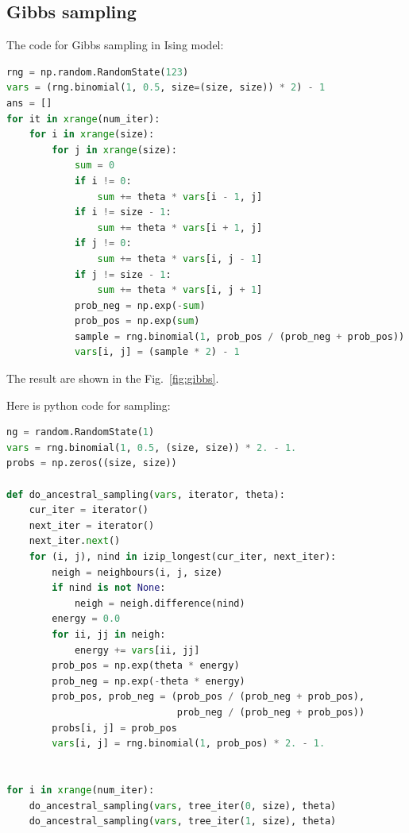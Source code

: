 \documentclass[a4paper]{article}
\begin{document}
\subsection{Gibbs sampling}
The code for Gibbs sampling in Ising model:
\begin{lstlisting}[language=Python]
rng = np.random.RandomState(123)
vars = (rng.binomial(1, 0.5, size=(size, size)) * 2) - 1
ans = []
for it in xrange(num_iter):
    for i in xrange(size):
        for j in xrange(size):
            sum = 0
            if i != 0:
                sum += theta * vars[i - 1, j]
            if i != size - 1:
                sum += theta * vars[i + 1, j]
            if j != 0:
                sum += theta * vars[i, j - 1]
            if j != size - 1:
                sum += theta * vars[i, j + 1]
            prob_neg = np.exp(-sum)
            prob_pos = np.exp(sum)
            sample = rng.binomial(1, prob_pos / (prob_neg + prob_pos))
            vars[i, j] = (sample * 2) - 1
\end{lstlisting}
The result are shown in the Fig.~\ref{fig:gibbs}.

Here is python code for sampling:
\begin{lstlisting}[language=Python]
ng = random.RandomState(1)
vars = rng.binomial(1, 0.5, (size, size)) * 2. - 1.
probs = np.zeros((size, size))

def do_ancestral_sampling(vars, iterator, theta):
    cur_iter = iterator()
    next_iter = iterator()
    next_iter.next()
    for (i, j), nind in izip_longest(cur_iter, next_iter):
        neigh = neighbours(i, j, size)
        if nind is not None:
            neigh = neigh.difference(nind)
        energy = 0.0
        for ii, jj in neigh:
            energy += vars[ii, jj]
        prob_pos = np.exp(theta * energy)
        prob_neg = np.exp(-theta * energy)
        prob_pos, prob_neg = (prob_pos / (prob_neg + prob_pos),
                              prob_neg / (prob_neg + prob_pos))
        probs[i, j] = prob_pos
        vars[i, j] = rng.binomial(1, prob_pos) * 2. - 1.
        
        
for i in xrange(num_iter):
    do_ancestral_sampling(vars, tree_iter(0, size), theta)
    do_ancestral_sampling(vars, tree_iter(1, size), theta)
\end{lstlisting}
\end{document}
